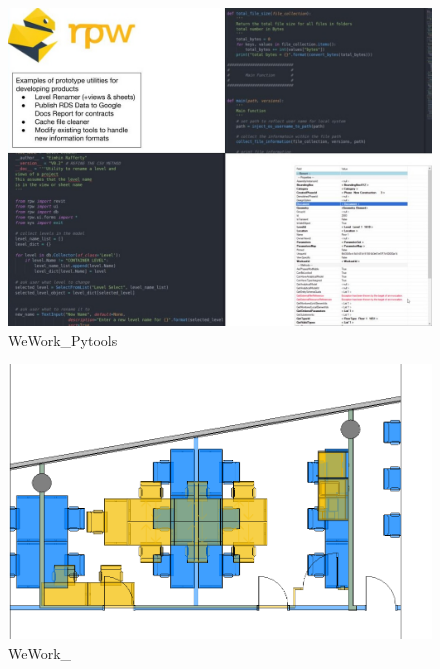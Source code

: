 \documentclass[
]{article}
\begin{document}
\begin{figure}[H]

{\centering \includegraphics{assets/WeWork/WeWorkTools.jpg}

}

\caption{WeWork\_Pytools}

\end{figure}%
\begin{figure}[H]

{\centering \includegraphics{assets/WeWork/WeWork-Coodinatoin-As-Built.png}

}

\caption{WeWork\_}

\end{figure}%
\end{document}
